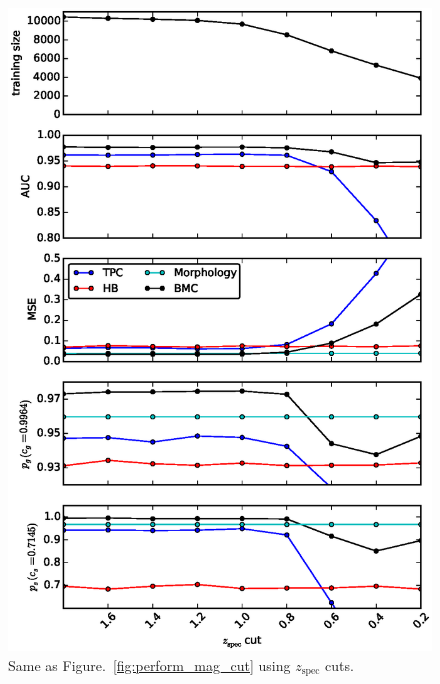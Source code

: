 \documentclass[useAMS,usenatbib]{mn2e}
\begin{document}
\begin{figure}
    \includegraphics[width=\linewidth]{figures/perform_z_cut.eps}
    \caption{Same as Figure.~\ref{fig:perform_mag_cut} using
      $z_{\text{spec}}$ cuts.}
    \label{fig:perform_z_cut}
\end{figure}
\end{document}
